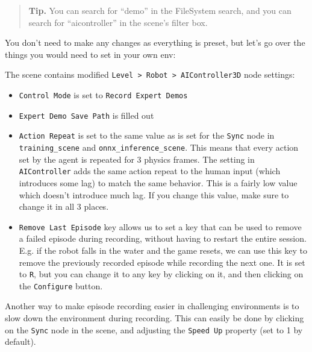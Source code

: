 \documentclass[11pt,a4paper]{article}
\begin{document}
\begin{quote}
\textbf{Tip.} You can search for ``demo'' in the FileSystem search, and you can search for ``aicontroller'' in the scene's filter box.
\end{quote}


You don't need to make any changes as everything is preset, but let's go over the things you would need to set in your own env:

The scene contains modified \passthrough{\lstinline!Level > Robot > AIController3D!} node settings:

\begin{itemize}
\tightlist
\item
  \passthrough{\lstinline!Control Mode!} is set to \passthrough{\lstinline!Record Expert Demos!}
\item
  \passthrough{\lstinline!Expert Demo Save Path!} is filled out
\item
  \passthrough{\lstinline!Action Repeat!} is set to the same value as is set for the \passthrough{\lstinline!Sync!} node in \passthrough{\lstinline!training_scene!} and \passthrough{\lstinline!onnx_inference_scene!}. This means that every action set by the agent is repeated for 3 physics frames. The setting in \passthrough{\lstinline!AIController!} adds the same action repeat to the human input (which introduces some lag) to match the same behavior. This is a fairly low value which doesn't introduce much lag. If you change this value, make sure to change it in all 3 places.
\item
  \passthrough{\lstinline!Remove Last Episode!} key allows us to set a key that can be used to remove a failed episode during recording, without having to restart the entire session. E.g. if the robot falls in the water and the game resets, we can use this key to remove the previously recorded episode while recording the next one. It is set to \passthrough{\lstinline!R!}, but you can change it to any key by clicking on it, and then clicking on the \passthrough{\lstinline!Configure!} button.
\end{itemize}

Another way to make episode recording easier in challenging environments is to slow down the environment during recording. This can easily be done by clicking on the \passthrough{\lstinline!Sync!} node in the scene, and adjusting the \passthrough{\lstinline!Speed Up!} property (set to 1 by default).
\end{document}
